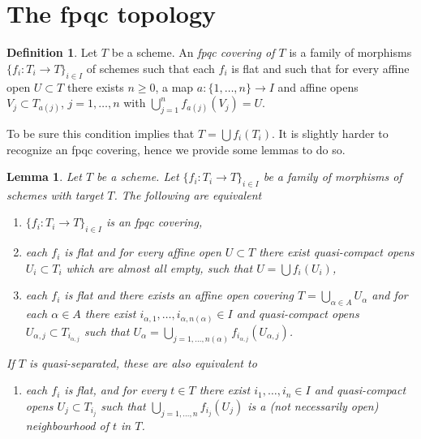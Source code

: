 \documentclass{stacks-project}
\theoremstyle{plain}
\newtheorem{lemma}[subsection]{Lemma}
\theoremstyle{definition}
\newtheorem{definition}[subsection]{Definition}
\theoremstyle{remark}
\numberwithin{equation}{subsection}
\begin{document}
\section{The fpqc topology}
\label{section-fpqc}

\begin{definition}
\label{definition-fpqc-covering}
Let $T$ be a scheme. An {\it fpqc covering of $T$} is a family
of morphisms $\{f_i : T_i \to T\}_{i \in I}$ of schemes
such that each $f_i$ is flat and such that for every affine open
$U \subset T$ there exists $n \geq 0$, a map
$a : \{1, \ldots, n\} \to I$ and affine opens
$V_j \subset T_{a(j)}$, $j = 1, \ldots, n$
with $\bigcup_{j = 1}^n f_{a(j)}(V_j) = U$.
\end{definition}

\noindent
To be sure this condition implies that $T = \bigcup f_i(T_i)$.
It is slightly harder to recognize an fpqc covering, hence we provide
some lemmas to do so.

\begin{lemma}
\label{lemma-recognize-fpqc-covering}
Let $T$ be a scheme. Let $\{f_i : T_i \to T\}_{i \in I}$ be a family of
morphisms of schemes with target $T$. The following are equivalent
\begin{enumerate}
\item $\{f_i : T_i \to T\}_{i \in I}$ is an fpqc covering,
\item each $f_i$ is flat and for every affine open $U \subset T$
there exist quasi-compact opens
$U_i \subset T_i$ which are almost all empty,
such that $U = \bigcup f_i(U_i)$,
\item each $f_i$ is flat and there exists an affine open covering
$T = \bigcup_{\alpha \in A} U_\alpha$ and for each $\alpha \in A$
there exist $i_{\alpha, 1}, \ldots, i_{\alpha, n(\alpha)} \in I$
and quasi-compact opens $U_{\alpha, j} \subset T_{i_{\alpha, j}}$ such that
$U_\alpha =
\bigcup_{j = 1, \ldots, n(\alpha)} f_{i_{\alpha, j}}(U_{\alpha, j})$.
\end{enumerate}
If $T$ is quasi-separated, these are also equivalent to
\begin{enumerate}
\item[(4)] each $f_i$ is flat, and for every $t \in T$ there exist
$i_1, \ldots, i_n \in I$ and quasi-compact opens $U_j \subset T_{i_j}$
such that $\bigcup_{j = 1, \ldots, n} f_{i_j}(U_j)$ is a
(not necessarily open) neighbourhood of $t$ in $T$.
\end{enumerate}
\end{lemma}
\end{document}
